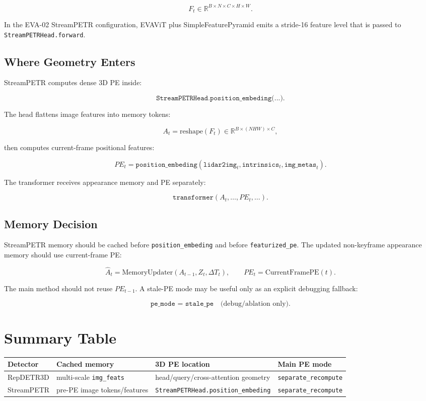 \documentclass[11pt]{article}
\begin{document}
\[
F_t \in \mathbb{R}^{B \times N \times C \times H \times W}.
\]

In the EVA-02 StreamPETR configuration, EVAViT plus SimpleFeaturePyramid emits a stride-16 feature level that is passed to \texttt{StreamPETRHead.forward}.

\subsection{Where Geometry Enters}

StreamPETR computes dense 3D PE inside:

\[
\texttt{StreamPETRHead.position\_embeding(...)}.
\]

The head flattens image features into memory tokens:

\[
A_t = \text{reshape}(F_t) \in \mathbb{R}^{B \times (N H W) \times C},
\]

then computes current-frame positional features:

\[
PE_t = \texttt{position\_embeding}(\texttt{lidar2img}_t, \texttt{intrinsics}_t, \texttt{img\_metas}_t).
\]

The transformer receives appearance memory and PE separately:

\[
\texttt{transformer}(A_t, \ldots, PE_t, \ldots).
\]

\subsection{Memory Decision}

StreamPETR memory should be cached before \texttt{position\_embeding} and before \texttt{featurized\_pe}. The updated non-keyframe appearance memory should use current-frame PE:

\[
\hat{A}_t = \text{MemoryUpdater}(A_{t-1}, Z_t, \Delta T_t),
\qquad
PE_t = \text{CurrentFramePE}(t).
\]

The main method should not reuse \(PE_{t-1}\). A stale-PE mode may be useful only as an explicit debugging fallback:

\[
\texttt{pe\_mode = stale\_pe} \quad \text{(debug/ablation only)}.
\]

\section{Summary Table}

\begin{table}[h]
\centering
\begin{tabular}{llll}
\toprule
Detector & Cached memory & 3D PE location & Main PE mode \\
\midrule
RepDETR3D & multi-scale \texttt{img\_feats} & head/query/cross-attention geometry & \texttt{separate\_recompute} \\
StreamPETR & pre-PE image tokens/features & \texttt{StreamPETRHead.position\_embeding} & \texttt{separate\_recompute} \\
\bottomrule
\end{tabular}
\end{table}
\end{document}
